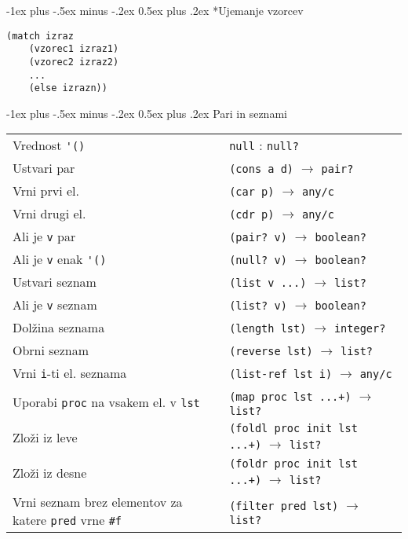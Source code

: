 \documentclass[a3paper,9pt]{extarticle}
\makeatletter
\renewcommand{\section}{\@startsection{section}{1}{0mm}%
                                {-1ex plus -.5ex minus -.2ex}%
                                {0.5ex plus .2ex}%
                                {\normalfont\large\bfseries}}
\makeatother
\begin{document}
\begin{multicols}{4}
\section*{Ujemanje vzorcev}
\begin{lstlisting}
(match izraz
    (vzorec1 izraz1)
    (vzorec2 izraz2)
    ...
    (else izrazn))
\end{lstlisting}

\section{Pari in seznami}

\begin{tabular}{@{}p{3.2cm}l@{}}
    Vrednost \lstinline|'()| & \lstinline|null| : \lstinline|null?|\\
    Ustvari par & \lstinline|(cons a d)| $\rightarrow$ \lstinline|pair?|\\
    Vrni prvi el. & \lstinline|(car p)| $\rightarrow$ \lstinline|any/c|\\
    Vrni drugi el. & \lstinline|(cdr p)| $\rightarrow$ \lstinline|any/c|\\
    Ali je \lstinline|v| par & \lstinline|(pair? v)| $\rightarrow$ \lstinline|boolean?|\\
    Ali je \lstinline|v| enak \lstinline|'()| & \lstinline|(null? v)| $\rightarrow$ \lstinline|boolean?|\\
    Ustvari seznam & \lstinline|(list v ...)| $\rightarrow$ \lstinline|list?|\\
    Ali je \lstinline|v| seznam & \lstinline|(list? v)| $\rightarrow$ \lstinline|boolean?|\\
    Dolžina seznama & \lstinline|(length lst)| $\rightarrow$ \lstinline|integer?|\\
    Obrni seznam & \lstinline|(reverse lst)| $\rightarrow$ \lstinline|list?|\\
    Vrni \lstinline|i|-ti el. seznama & \lstinline|(list-ref lst i)| $\rightarrow$ \lstinline|any/c|\\
    Uporabi \lstinline|proc| na vsakem el. v \lstinline|lst| & \lstinline|(map proc lst ...+)| $\rightarrow$ \lstinline|list?|\\
    Zloži iz leve & \lstinline|(foldl proc init lst ...+)| $\rightarrow$ \lstinline|list?|\\
    Zloži iz desne & \lstinline|(foldr proc init lst ...+)| $\rightarrow$ \lstinline|list?|\\
    Vrni seznam brez elementov za katere \lstinline|pred| vrne \lstinline|#f| & \lstinline|(filter pred lst)| $\rightarrow$ \lstinline|list?|\\
\end{tabular}


\end{multicols}
\end{document}
